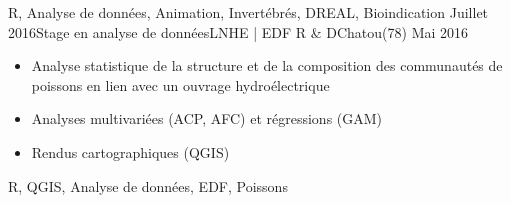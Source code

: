 \begin{experiences}
{\begin{itemize}
                      \end{itemize}
                    }
                    {R, Analyse de données, Animation, Invertébrés, DREAL, Bioindication}
  \emptySeparator
  \experience
    {Juillet 2016}{Stage en analyse de données}{LNHE | EDF R \& D}{Chatou(78)}
    {Mai 2016}    {
                      \begin{itemize}
                        \item Analyse statistique de la structure et de la composition des communautés de poissons en lien avec un ouvrage hydroélectrique
                        \item Analyses multivariées (ACP, AFC) et régressions (GAM) 
                        \item Rendus cartographiques (QGIS)                   
                      \end{itemize}
                    }
                    {R, QGIS,  Analyse de données, EDF, Poissons}
  \emptySeparator
  
\end{experiences}
